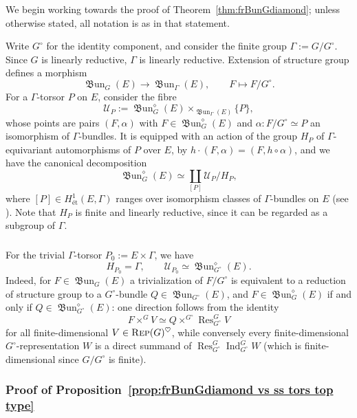 \documentclass[12pt, oneside]{amsart}
\numberwithin{equation}{section}
\theoremstyle{remark}
\theoremstyle{plain}
\newcommand{\Rep}{\textsc{Rep}}
\newcommand{\UU}{\mathcal{U}}
\newcommand{\frBun}{\operatorname{\mathfrak{B}un}}
\begin{document}
We begin working towards the proof of Theorem~\ref{thm:frBunGdiamond}; unless otherwise stated, all notation is as in that statement.

Write $G^\circ$ for the identity component, and consider the finite group $\Gamma := G/G^\circ$.
Since $G$ is linearly reductive, $\Gamma$ is linearly reductive.
Extension of structure group defines a morphism
\begin{equation}\label{eq:BunG to BunGamma}
  \frBun_G(E) \to \frBun_\Gamma(E),
  \qquad F \mapsto F/G^\circ.
\end{equation}
For a $\Gamma$-torsor $P$ on $E$, consider the fibre
\[
  \UU_P := \frBun_G^\diamond(E)
  \times_{\frBun_\Gamma(E)} \{P\},
\]
whose points are pairs $(F,\alpha)$ with $F \in \frBun_G^\diamond(E)$ and $\alpha : F/G^\circ \simeq P$ an isomorphism of $\Gamma$-bundles.
It is equipped with an action of the group $H_P$ of $\Gamma$-equivariant automorphisms of $P$ over $E$, by $h\cdot(F,\alpha)=(F,h\circ\alpha)$, and we have the canonical decomposition
\[
  \frBun_G^\diamond(E)
  \simeq \coprod_{[P]} \UU_P/H_P,
\]
where $[P] \in H^1_{\text{\'et}}(E, \Gamma)$ ranges over isomorphism classes of $\Gamma$-bundles on $E$ (see \cite[Prop.~3.1]{ORT}).
Note that $H_P$ is finite and linearly reductive, since it can be regarded as a subgroup of $\Gamma$.

\subsubsection{}\label{sssec:U_P0 = BunGcirc}

For the trivial $\Gamma$-torsor $P_0 := E \times \Gamma$, we have
\[
  H_{P_0} = \Gamma, \qquad
  \UU_{P_0} \simeq \frBun_{G^\circ}^\diamond(E).
\]
Indeed, for $F \in \frBun_G(E)$ a trivialization of $F/G^\circ$ is equivalent to a reduction of structure group to a $G^\circ$-bundle $Q \in \frBun_{G^\circ}(E)$, and $F \in \frBun_G^\diamond(E)$ if and only if $Q \in \frBun_{G^\circ}^\diamond(E)$: one direction follows from the identity
\[
  F \times^G V \simeq Q \times^{G^\circ} \operatorname{Res}_{G^\circ}^G V
\]
for all finite-dimensional $V \in \Rep(G)^\heartsuit$, while conversely every finite-dimensional $G^\circ$-representation $W$ is a direct summand of $\operatorname{Res}_{G^\circ}^G\operatorname{Ind}_{G^\circ}^G W$ (which is finite-dimensional since $G/G^\circ$ is finite).

\subsubsection{Proof of Proposition~\ref{prop:frBunGdiamond vs ss tors top type}}
\label{sssec:proof of frBunGdiamond vs ss tors top type}
\end{document}
